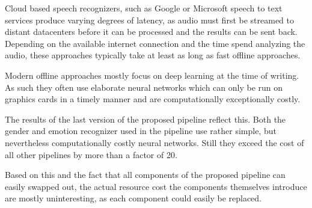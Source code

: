 Cloud based speech recognizers, such as Google or Microsoft speech to text services produce varying degrees of latency, as audio must first be streamed to distant datacenters before it can be processed and the results can be sent back.
Depending on the available internet connection and the time spend analyzing the audio, these approaches typically take at least as long as fast offline approaches.

Modern offline approaches mostly focus on deep learning at the time of writing. 
As such they often use elaborate neural networks which can only be run on graphics cards in a timely manner and are computationally exceptionally costly.

The results of the last version of the proposed pipeline reflect this.
Both the gender and emotion recognizer used in the pipeline use rather simple, but nevertheless computationally costly neural networks.
Still they exceed the cost of all other pipelines by more than a factor of 20.

Based on this and the fact that all components of the proposed pipeline can easily swapped out, the actual resource cost the components themselves introduce are mostly uninteresting, as each component could easily be replaced.